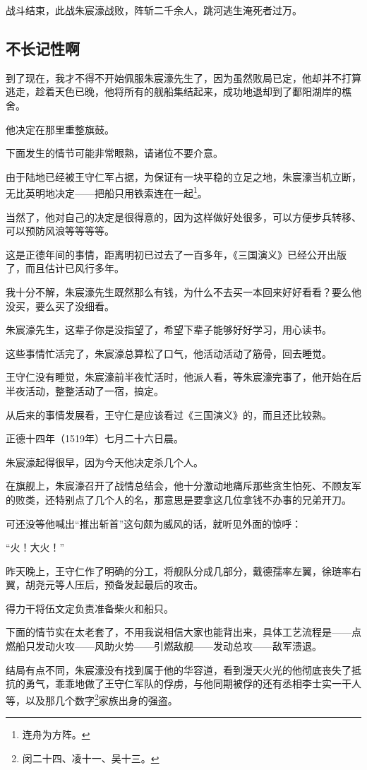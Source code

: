 \begin{multicols}{\theparacolNo}
战斗结束，此战朱宸濠战败，阵斩二千余人，跳河逃生淹死者过万。

\subsection{不长记性啊}
到了现在，我才不得不开始佩服朱宸濠先生了，因为虽然败局已定，他却并不打算逃走，趁着天色已晚，他将所有的舰船集结起来，成功地退却到了鄱阳湖岸的樵舍。

他决定在那里重整旗鼓。

下面发生的情节可能非常眼熟，请诸位不要介意。

由于陆地已经被王守仁军占据，为保证有一块平稳的立足之地，朱宸濠当机立断，无比英明地决定——把船只用铁索连在一起\footnote{连舟为方阵。}。

当然了，他对自己的决定是很得意的，因为这样做好处很多，可以方便步兵转移、可以预防风浪等等等等。

这是正德年间的事情，距离明初已过去了一百多年，《三国演义》已经公开出版了，而且估计已风行多年。

我十分不解，朱宸濠先生既然那么有钱，为什么不去买一本回来好好看看？要么他没买，要么买了没细看。

朱宸濠先生，这辈子你是没指望了，希望下辈子能够好好学习，用心读书。

这些事情忙活完了，朱宸濠总算松了口气，他活动活动了筋骨，回去睡觉。

王守仁没有睡觉，朱宸濠前半夜忙活时，他派人看，等朱宸濠完事了，他开始在后半夜活动，整整活动了一宿，搞定。

从后来的事情发展看，王守仁是应该看过《三国演义》的，而且还比较熟。

正德十四年（1519年）七月二十六日晨。

朱宸濠起得很早，因为今天他决定杀几个人。

在旗舰上，朱宸濠召开了战情总结会，他十分激动地痛斥那些贪生怕死、不顾友军的败类，还特别点了几个人的名，那意思是要拿这几位拿钱不办事的兄弟开刀。

可还没等他喊出“推出斩首”这句颇为威风的话，就听见外面的惊呼：

“火！大火！”

昨天晚上，王守仁作了明确的分工，将舰队分成几部分，戴德孺率左翼，徐琏率右翼，胡尧元等人压后，预备发起最后的攻击。

得力干将伍文定负责准备柴火和船只。

下面的情节实在太老套了，不用我说相信大家也能背出来，具体工艺流程是——点燃船只发动火攻——风助火势——引燃敌舰——发动总攻——敌军溃退。

结局有点不同，朱宸濠没有找到属于他的华容道，看到漫天火光的他彻底丧失了抵抗的勇气，乖乖地做了王守仁军队的俘虏，与他同期被俘的还有丞相李士实一干人等，以及那几个数字\footnote{闵二十四、凌十一、吴十三。}家族出身的强盗。


\end{multicols}
